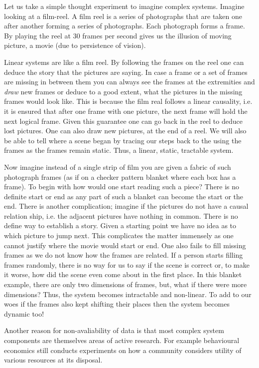 \documentclass[a4paper,12pt]{report}
\begin{document}
Let us take a simple thought experiment to imagine complex
systems. Imagine looking at a film-reel. A film reel is a series of
photographs that are taken one after another forming a series of
photographs. Each photograph forms a frame. By playing the reel at 30
frames per second gives us the illusion of moving picture, a movie
(due to persistence of vision).

Linear systems are like a film reel. By following the frames on the
reel one can deduce the story that the pictures are saying. In case a
frame or a set of frames are missing in between them you can always
see the frames at the extremities and \textit{draw} new frames or
deduce to a good extent, what the pictures in the missing frames would
look like. This is because the film real follows a linear causality,
i.e. it is ensured that after one frame with one picture, the next
frame will hold the next logical frame. Given this guarantee one can
go back in the reel to deduce lost pictures. One can also draw new
pictures, at the end of a reel. We will also be able to tell where a
scene began by tracing our steps back to the using the frames as the
frames remain static. Thus, a linear, static, tractable system.

Now imagine instead of a single strip of film you are given a fabric
of such photograph frames (as if on a checker pattern blanket where
each box has a frame). To begin with how would one start reading such
a piece? There is no definite start or end as any part of such a
blanket can become the start or the end. There is another
complication; imagine if the pictures do not have a causal relation
ship, i.e. the adjacent pictures have nothing in common. There is no
define way to establish a story. Given a starting point we have no
idea as to which picture to jump next. This complicates the matter
immensely as one cannot justify where the movie would start or
end. One also fails to fill missing frames as we do not know how the
frames are related. If a person starts filling frames randomly, there
is no way for us to say if the scene is correct or, to make it worse,
how did the scene even come about in the first place. In this blanket
example, there are only two dimensions of frames, but, what if there
were more dimensions? Thus, the system becomes intractable and
non-linear. To add to our woes if the frames also kept shifting their
places then the system becomes dynamic too!


Another reason for non-avaliability of data is that most complex
system components are themselves areas of active research. For example
behavioural economics still conducts experiments on how a community
considers utility of various resources at its disposal.
\end{document}
